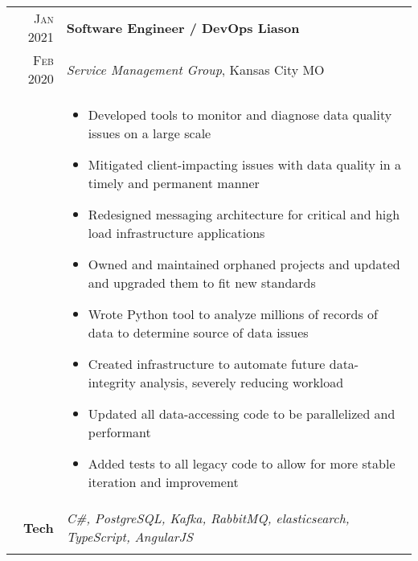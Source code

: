 \documentclass[a4paper,10pt]{article}
\newcommand{\br}{\\\multicolumn{2}{c}{}}
\begin{document}
\begin{tabular}{r|p{15cm}}
  \textsc{Jan 2021}  & \textbf{Software Engineer / DevOps Liason} \\
  \textsc{Feb 2020}  & \textit{Service Management Group}, Kansas City MO
  \\ &
       \begin{itemize}
       \item Developed tools to monitor and diagnose data quality issues on a large scale
       \item Mitigated client-impacting issues with data quality in a timely and permanent manner
       \item Redesigned messaging architecture for critical and high load infrastructure applications
       \item Owned and maintained orphaned projects and updated and upgraded them to fit new standards
       \item Wrote Python tool to analyze millions of records of data to determine source of data issues
       \item Created infrastructure to automate future data-integrity analysis, severely reducing workload
       \item Updated all data-accessing code to be parallelized and performant
       \item Added tests to all legacy code to allow for more stable iteration and improvement
       \end{itemize} \\
  \textbf{Tech} & \textit{C\#, PostgreSQL, Kafka, RabbitMQ, elasticsearch, TypeScript, AngularJS} \br \\
\end{tabular}
\end{document}

